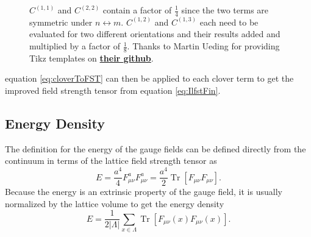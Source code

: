 \documentclass[a4paper,10pt]{book}
\begin{document}
\begin{figure}
\begin{subfigure}[b]{0.4\textwidth}
{
}
\end{subfigure}
\caption[Lattice field strength tensor clovers]{$C^{(1,1)}$ and $C^{(2,2)}$ contain a factor of $\frac{1}{4}$ since the two terms are symmetric under $n\leftrightarrow m$. $C^{(1,2)}$ and $C^{(1,3)}$ each need to be evaluated for two different orientations and their results added and multiplied by a factor of $\frac{1}{8}$. Thanks to Martin Ueding for providing Tikz templates on \href{https://github.com/HISKP-LQCD/lqcd-tikz-graphics}{\textbf{their github}}.}
\label{fig:Clovers}
\end{figure}
equation \eqref{eq:cloverToFST} can then be applied to each clover term to get the improved field strength tensor from equation \eqref{eq:IlfstFin}.
\subsection{Energy Density}
The definition for the energy of the gauge fields can be defined directly from the continuum in terms of the lattice field strength tensor as
\begin{equation}
E=\frac{a^4}{4} F_{\mu \nu}^{a} F_{\mu \nu}^{a} = \frac{a^4}{2}\operatorname{Tr}\left[ F_{\mu \nu} F_{\mu \nu}\right].
\end{equation}
Because the energy is an extrinsic property of the gauge field, it is usually normalized by the lattice volume to get the energy density
\begin{equation}
E = \frac{1}{2\left| \Lambda \right|}\sum\limits_{x\in\Lambda}\operatorname{Tr}\left[ F_{\mu \nu}(x) F_{\mu \nu}(x)\right].
\end{equation}
\end{document}

